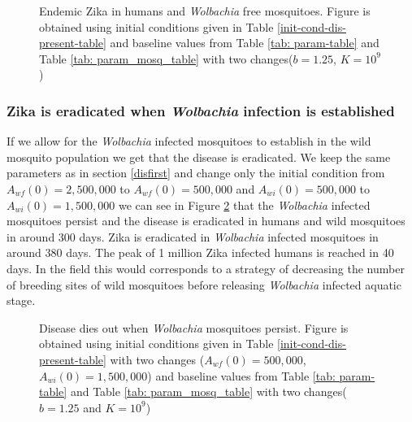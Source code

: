 \documentclass{ws-rv9x6}
\begin{document}
\begin{figure}[H]
\centering
    
    \makebox[0pt][l]{}%
    \makebox[0pt][l]{}%
    \makebox[0pt][l]{}%
\caption{Endemic Zika in humans and \textit{Wolbachia} free mosquitoes. Figure is obtained using initial conditions given in Table \ref{init-cond-dis-present-table} and baseline values from Table \ref{tab: param-table} and Table \ref{tab: param_mosq_table}  with two changes($b=1.25$, $K=10^9$)}
\label{e4allnice}
\end{figure}


\subsubsection{Zika is eradicated when \textit{Wolbachia} infection is established }\label{dissecond}
If we allow for the \textit{Wolbachia} infected mosquitoes to establish in the wild mosquito population we get that the disease is eradicated.  
We keep the same parameters as in section \ref{disfirst} and change only the initial condition from $A_{wf}(0)= 2,500,000$ to $A_{wf}(0)=500,000$ and $A_{wi}(0)=500,000$ to  $A_{wi}(0)=1,500,000$ we can see in Figure \ref{wpe4} that the \textit{Wolbachia} infected mosquitoes persist and the disease is eradicated in humans and wild mosquitoes in around 300 days. Zika is eradicated in \textit{Wolbachia} infected mosquitoes in around 380 days. The peak of 1 million Zika infected humans is reached in 40 days. In the field this would corresponds to a strategy of decreasing the number of breeding sites of wild mosquitoes before releasing \textit{Wolbachia} infected aquatic stage.

\begin{figure}[H]
\centering
    
    \makebox[0pt][l]{}%
    \makebox[0pt][l]{}%
    \makebox[0pt][l]{}%
\caption{Disease dies out when \textit{Wolbachia} mosquitoes persist. Figure is obtained using initial conditions given in Table \ref{init-cond-dis-present-table} with two changes ($A_{wf}(0)=500,000$, $A_{wi}(0)=1,500,000$)  and baseline values from Table \ref{tab: param-table} and Table \ref{tab: param_mosq_table}  with two changes( $b=1.25$ and $K=10^9$)}
\label{wpe4}
\end{figure}
   
\end{document}

